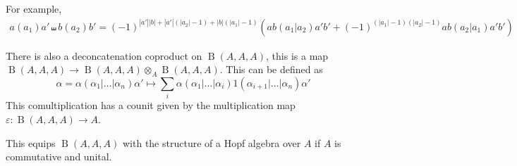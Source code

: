 \documentclass{scrartcl}
\theoremstyle{plain}
\newtheorem{theorem}{Theorem}[section]
\newtheorem{lemma}[theorem]{Lemma}
\theoremstyle{definition}
\newcommand{\N}{\mathbb N}
\newcommand{\abs}[1]{\left\lvert#1\right\rvert}
\let\xto\xrightarrow
\DeclareMathOperator{\id}{id}
\DeclareMathOperator{\colim}{colim}
\DeclareMathOperator{\BC}{B}
\begin{document}
For example,
\begin{align*}
    a(a_1)a' \shuffle b(a_2)b' = (-1)^{\abs{a'}\abs{b}+\abs{a'}(\abs{a_2}-1) + \abs{b}(\abs{a_1}-1)}\left(ab(a_1|a_2)a'b' + (-1)^{(\abs{a_1}-1)(\abs{a_2}-1)}ab(a_2|a_1)a'b'\right)
\end{align*}

There is also a deconcatenation coproduct on $\BC(A, A, A)$, this is a map $\BC(A, A, A)\to \BC(A, A, A)\otimes_A \BC(A, A, A)$. This can be defined as 
$$\alpha = \alpha(\alpha_1|\dots|\alpha_n)\alpha' \mapsto \sum_i\alpha(\alpha_1|\dots|\alpha_i) 1 (\alpha_{i+1}|\dots|\alpha_n)\alpha'$$
This comultiplication has a counit given by the multiplication map $\varepsilon \colon \BC(A, A, A)\to A$. 

This equips $\BC(A, A, A)$ with the structure of a Hopf algebra over $A$ if $A$ is commutative and unital.

    
\end{document}
